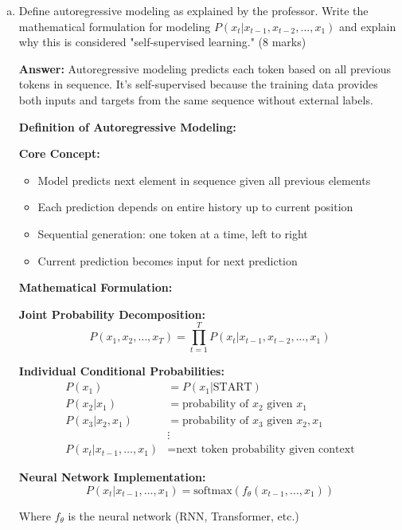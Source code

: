\documentclass[12pt]{article}
\newcommand{\answer}[1]{{\color{answercolor}\textbf{Answer:} #1}}
\newcommand{\explanation}[1]{{\color{explanationcolor}#1}}
\begin{document}
\begin{enumerate}[(a)]
    \item Define autoregressive modeling as explained by the professor. Write the mathematical formulation for modeling $P(x_t | x_{t-1}, x_{t-2}, \ldots, x_1)$ and explain why this is considered "self-supervised learning." \hfill (8 marks)
    
    \answer{Autoregressive modeling predicts each token based on all previous tokens in sequence. It's self-supervised because the training data provides both inputs and targets from the same sequence without external labels.}
    
    \explanation{
    \textbf{Definition of Autoregressive Modeling:}
    
    \textbf{Core Concept:}
    \begin{itemize}
        \item Model predicts next element in sequence given all previous elements
        \item Each prediction depends on entire history up to current position
        \item Sequential generation: one token at a time, left to right
        \item Current prediction becomes input for next prediction
    \end{itemize}
    
    \textbf{Mathematical Formulation:}
    
    \textbf{Joint Probability Decomposition:}
    $$P(x_1, x_2, \ldots, x_T) = \prod_{t=1}^T P(x_t | x_{t-1}, x_{t-2}, \ldots, x_1)$$
    
    \textbf{Individual Conditional Probabilities:}
    \begin{align}
    P(x_1) &= P(x_1 | \text{START}) \\
    P(x_2 | x_1) &= \text{probability of } x_2 \text{ given } x_1 \\
    P(x_3 | x_2, x_1) &= \text{probability of } x_3 \text{ given } x_2, x_1 \\
    &\vdots \\
    P(x_t | x_{t-1}, \ldots, x_1) &= \text{next token probability given context}
    \end{align}
    
    \textbf{Neural Network Implementation:}
    $$P(x_t | x_{t-1}, \ldots, x_1) = \text{softmax}(f_\theta(x_{t-1}, \ldots, x_1))$$
    
    Where $f_\theta$ is the neural network (RNN, Transformer, etc.)
    
}
\end{enumerate}
\end{document}
